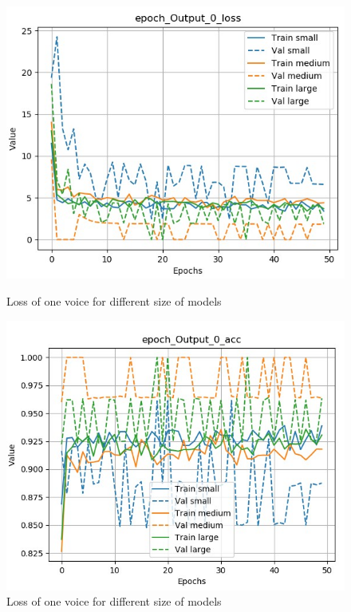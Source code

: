 \documentclass[12pt]{report}
\begin{document}
\begin{figure}[htbp]
    \begin{minipage}{0.5\textwidth}
        \begin{center}
            \includegraphics[width=\textwidth]{images/experiences/size/loss-output-comparison-size.jpg}
            \caption{Loss of one voice for different size of models}
            \label{fig:loss-output-comparison-size}
        \end{center}
    \end{minipage} \hfill
    \begin{minipage}{0.5 \textwidth}
        \begin{center}
            \includegraphics[width=\textwidth]{images/experiences/size/acc-output-comparison-size.jpg}
            \caption{Loss of one voice for different size of models}
            \label{fig:acc-output-comparison-size}
        \end{center}
    \end{minipage}
\end{figure}
\end{document}
